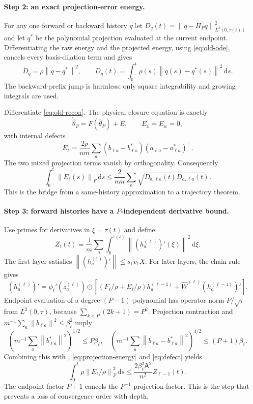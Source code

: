 \documentclass[11pt]{article}
\theoremstyle{definition}
\theoremstyle{remark}
\newcommand{\norm}[1]{\left\lVert #1\right\rVert}
\newcommand{\od}{\mathbin{\odot}}
\newcommand{\dd}{\,\mathrm{d}}
\begin{document}
\paragraph{Step 2: an exact projection-error energy.}
For any one forward or backward history $q$ let
$D_q(t)=\norm{q-\Pi_Pq}_{L^2(0,\tau(t))}^2$ and let $q^*$ be the polynomial
projection evaluated at the current endpoint.  Differentiating the raw energy
and the projected energy, using \eqref{eq:old-ode}, cancels every basis-dilation
term and gives
\begin{equation}
 \dot D_q=\rho\norm{q-q^*}^2,
 \qquad D_q(t)=\int_0^t\rho(s)\norm{q(s)-q^*(s)}^2\dd s. \label{eq:projection-energy}
\end{equation}
The backward-prefix jump is harmless: only square integrability and growing
integrals are used.

Differentiate \eqref{eq:old-recon}.  The physical closure equation is exactly
\begin{equation}
 \dot{\widehat\theta}_P=F(\widehat\theta_P)+E,\qquad E_1=E_w=0,
\end{equation}
with internal defects
\begin{equation}
 E_\ell=\frac{2\rho}{nm}\sum_a
 (b_{\ell a}-b_{\ell a}^*)(a_{\ell a}-a_{\ell a}^*)^\top. \label{eq:defect}
\end{equation}
The two mixed projection terms vanish by orthogonality.  Consequently
\begin{equation}
 \int_0^t\norm{E_\ell(s)}_F\dd s
 \le\frac{2}{nm}\sum_a\sqrt{D_{b,\ell a}(t)D_{a,\ell a}(t)}. \label{eq:defect-energy}
\end{equation}
This is the bridge from a same-history approximation to a trajectory theorem.

\paragraph{Step 3: forward histories have a $P$-independent derivative
bound.}
Use primes for derivatives in $\xi=\tau(t)$ and define
\[
 Z_\ell(t)=\frac1m\sum_a\int_0^{\tau(t)}
 \norm{(h_a^{(\ell)})'(\xi)}^2\dd\xi.
\]
The first layer satisfies
$\norm{(h_a^{(1)})'}\le s_1v_1X$.  For later layers, the chain rule gives
\[
 (h_a^{(\ell)})'=\phi_\ell'(z_a^{(\ell)})\od
 \left[(F_\ell/\rho+E_\ell/\rho)h_a^{(\ell-1)}
 +\widehat W^{(\ell)}(h_a^{(\ell-1)})'\right].       \label{eq:forward-chain}
\]
Endpoint evaluation of a degree-$(P-1)$ polynomial has operator norm
$P/\sqrt\tau$ from $L^2(0,\tau)$, because
$\sum_{k<P}(2k+1)=P^2$.  Projection contraction and
$m^{-1}\sum_a\norm{b_{\ell a}}^2\le\beta_\ell^2$ imply
\[
 \left(m^{-1}\sum_a\norm{b_{\ell a}^*}^2\right)^{1/2}\le P\beta_\ell,
 \quad
 \left(m^{-1}\sum_a\norm{b_{\ell a}-b_{\ell a}^*}^2\right)^{1/2}
 \le(P+1)\beta_\ell.
\]
Combining this with ,
\eqref{eq:projection-energy} and \eqref{eq:defect} yields
\begin{equation}
 \int_0^t\rho\norm{E_\ell/\rho}_F^2\dd s
 \le\frac{2\beta_\ell^2\mathsf A^2}{n^2}
 Z_{\ell-1}(t).                                      \label{eq:e-square}
\end{equation}
The endpoint factor $P+1$ cancels the $P^{-1}$ projection factor.  This is
the step that prevents a loss of convergence order with depth.
\end{document}
